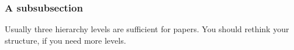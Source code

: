 \documentclass{acm_proc_article-sp}
\begin{document}
\subsubsection{A subsubsection}
Usually three hierarchy levels are sufficient for papers. You should rethink your structure, if you need more levels. \cite{bowman:reasoning}

%
%
%




\balancecolumns
\end{document}
